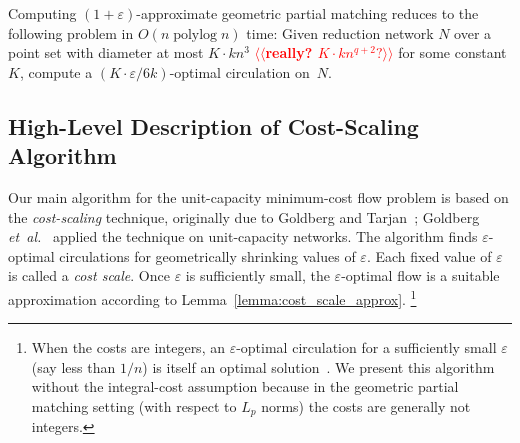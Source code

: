 \documentclass[a4paper,UKenglish]{socg-lipics-v2018}
\makeatletter
\def\note#1{\textcolor{red}{{#1}}}
\def\etal{\emph{et~al.}}
\def\etal{\textit{et~al.}}
\def\polylog{\mathop{\mathrm{polylog}}}
\def\eps{\varepsilon}
\def\cost{\operatorname{cost}}
\theoremstyle{plain}
\numberwithin{figure}{section}
\def\EMPH#1{\textcolor{BrickRed}{{\emph{#1}}}}
\def\n@te#1{\textsf{\boldmath \textbf{$\langle\!\langle$#1$\rangle\!\rangle$}}\leavevmode}
\def\note#1{\textcolor{red}{\n@te{#1}}}
\makeatother
\begin{document}
\begin{toappendix}
%
\end{toappendix}

\begin{lemma}
\label{lemma:cost_scale_approx}
Computing $(1+\eps)$-approximate geometric partial matching reduces to the following problem in $O(n \polylog n)$ time:
Given reduction network $N$ over a point set with diameter at most $K \cdot kn^3$ \note{really? $K \cdot kn^{q+2}?$} for some constant $K$, compute a $(K \cdot \eps/6k)$-optimal circulation on~$N$.
\end{lemma}


\subsection{High-Level Description of Cost-Scaling Algorithm}
\label{SS:cost-scaling}

Our main algorithm for the unit-capacity minimum-cost flow problem is based on the \EMPH{cost-scaling} technique,
originally due to Goldberg and
Tarjan~\cite{GT90}; Goldberg \etal~\cite{GHKT17} applied the technique on unit-capacity networks.
%
The algorithm finds $\eps$-optimal circulations for geometrically shrinking
values of $\eps$.
Each fixed value of $\eps$ is called a
\EMPH{cost scale}.
Once $\eps$ is sufficiently small, the $\eps$-optimal flow is a suitable
approximation according to Lemma~\ref{lemma:cost_scale_approx}.%
\footnote{When the costs are integers, an $\eps$-optimal circulation for a sufficiently small $\eps$ (say less than $1/n$) is itself an optimal solution~\cite{GT90,GHKT17}.
We present this algorithm without the integral-cost assumption because in the geometric
partial matching setting (with respect to $L_p$ norms) the costs are generally not integers.}
\end{document}
